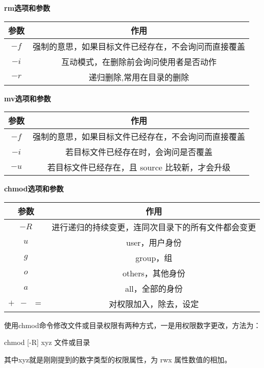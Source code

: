 \begin{center}
\textbf{rm\enspace 选项和参数}

	\begin{tabular}{cc}
		\toprule[1.5pt]
		参数 & 作用\\
		\midrule[1pt]
		$  -f $		&强制的意思，如果目标文件已经存在，不会询问而直接覆盖\\
		$  -i $		&互动模式，在删除前会询问使用者是否动作\\
		$  -r $		&递归删除,常用在目录的删除\\
		\bottomrule[1.5pt]
	\end{tabular}
\end{center}

\begin{center}
\textbf{mv\enspace 选项和参数}

	\begin{tabular}{cc}
		\toprule[1.5pt]
		参数 & 作用\\
		\midrule[1pt]
		$  -f $		&强制的意思，如果目标文件已经存在，不会询问而直接覆盖\\
		$  -i $		&若目标文件已经存在时，会询问是否覆盖\\
		$  -u $		&若目标文件已经存在，且 source 比较新，才会升级 \\
		\bottomrule[1.5pt]
	\end{tabular}
\end{center}

\begin{center}
\textbf{chmod\enspace 选项和参数}

	\begin{tabular}{cc}
		\toprule[1.5pt]
		参数 & 作用\\
		\midrule[1pt]
		$  -R $		&进行递归的持续变更，连同次目录下的所有文件都会变更\\
		$  u $		&user，用户身份\\
		$  g $		&group，组 \\
		$  o $		&others，其他身份 \\
		$  a $		&all，全部的身份 \\
		$  +\enspace -\enspace = $		&对权限加入，除去，设定 \\
		\bottomrule[1.5pt]
	\end{tabular}
\end{center}

使用chmod命令修改文件或目录权限有两种方式，一是用权限数字更改，方法为：

chmod [-R] xyz 文件或目录

其中xyz就是刚刚提到的数字类型的权限属性，为 rwx 属性数值的相加。

